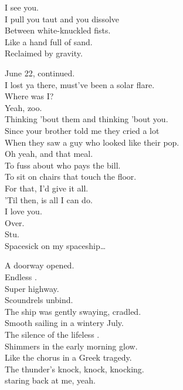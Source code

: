 I see you. \\
I pull you taut and you dissolve \\
Between white-knuckled fists. \\
Like a hand full of sand. \\
Reclaimed by gravity. \\


June 22, continued. \\
I lost ya there, must've been a solar flare. \\
Where was I? \\
Yeah, zoo. \\
Thinking 'bout them and thinking 'bout you. \\
Since your brother told me they cried a lot \\
When they saw a guy who looked like their pop. \\

Oh yeah, and that meal. \\
To fuss about who pays the bill. \\
To sit on chairs that touch the floor. \\
For that, I'd give it all. \\
'Til then,  is all I can do. \\
I love you. \\
Over. \\
Stu. \\

Spacesick on my spaceship… \\





A doorway opened. \\
Endless . \\
Super highway. \\
Scoundrels unbind. \\
The ship was gently swaying, cradled. \\
Smooth sailing in a wintery July. \\
The silence of the lifeless . \\
Shimmers in the early morning glow. \\
Like the chorus in a Greek tragedy. \\
The thunder's knock, knock, knocking. \\
 staring back at me, yeah. \\

